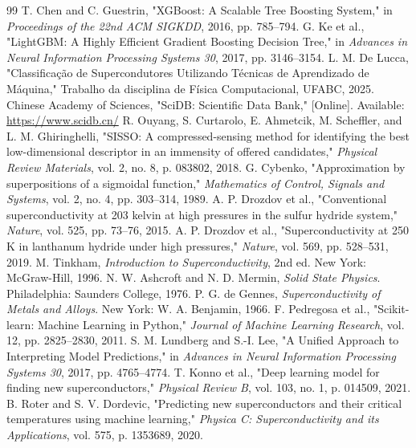 \documentclass[12pt, a4paper, oneside]{report}
\begin{document}
\begin{thebibliography}{99}
     T. Chen and C. Guestrin, "XGBoost: A Scalable Tree Boosting System," in \textit{Proceedings of the 22nd ACM SIGKDD}, 2016, pp. 785--794.
     G. Ke et al., "LightGBM: A Highly Efficient Gradient Boosting Decision Tree," in \textit{Advances in Neural Information Processing Systems 30}, 2017, pp. 3146--3154.
     L. M. De Lucca, "Classifica\c{c}\~ao de Supercondutores Utilizando T\'ecnicas de Aprendizado de M\'aquina," Trabalho da disciplina de F\'isica Computacional, UFABC, 2025.
     Chinese Academy of Sciences, "SciDB: Scientific Data Bank," [Online]. Available: \url{https://www.scidb.cn/}
     R. Ouyang, S. Curtarolo, E. Ahmetcik, M. Scheffler, and L. M. Ghiringhelli, "SISSO: A compressed-sensing method for identifying the best low-dimensional descriptor in an immensity of offered candidates," \textit{Physical Review Materials}, vol. 2, no. 8, p. 083802, 2018.
     G. Cybenko, "Approximation by superpositions of a sigmoidal function," \textit{Mathematics of Control, Signals and Systems}, vol. 2, no. 4, pp. 303--314, 1989.
     A. P. Drozdov et al., "Conventional superconductivity at 203 kelvin at high pressures in the sulfur hydride system," \textit{Nature}, vol. 525, pp. 73--76, 2015.
     A. P. Drozdov et al., "Superconductivity at 250 K in lanthanum hydride under high pressures," \textit{Nature}, vol. 569, pp. 528--531, 2019.
     M. Tinkham, \textit{Introduction to Superconductivity}, 2nd ed. New York: McGraw-Hill, 1996.
     N. W. Ashcroft and N. D. Mermin, \textit{Solid State Physics}. Philadelphia: Saunders College, 1976.
     P. G. de Gennes, \textit{Superconductivity of Metals and Alloys}. New York: W. A. Benjamin, 1966.
     F. Pedregosa et al., "Scikit-learn: Machine Learning in Python," \textit{Journal of Machine Learning Research}, vol. 12, pp. 2825--2830, 2011.
     S. M. Lundberg and S.-I. Lee, "A Unified Approach to Interpreting Model Predictions," in \textit{Advances in Neural Information Processing Systems 30}, 2017, pp. 4765--4774.
     T. Konno et al., "Deep learning model for finding new superconductors," \textit{Physical Review B}, vol. 103, no. 1, p. 014509, 2021.
     B. Roter and S. V. Dordevic, "Predicting new superconductors and their critical temperatures using machine learning," \textit{Physica C: Superconductivity and its Applications}, vol. 575, p. 1353689, 2020.
\end{thebibliography}
\end{document}
